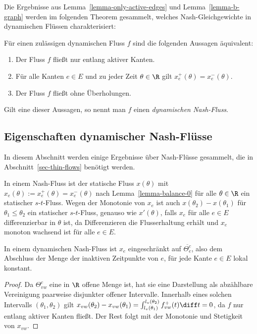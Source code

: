 Die Ergebnisse aus Lemma~\ref{lemma-only-active-edges} und Lemma~\ref{lemma-b-graph} werden im folgenden Theorem gesammelt, welches Nash-Gleichgewichte in dynamischen Flüssen charakterisiert:

\begin{theorem}\label{thm-equivalencies-nash-flow}
	Für einen zulässigen dynamischen Fluss $f$ sind die folgenden Aussagen äquivalent:
	\begin{enumerate}[label=(\roman*)]
		\item Der Fluss $f$ fließt nur entlang aktiver Kanten.
		\item Für alle Kanten $e\in E$ und zu jeder Zeit $\theta\in\R$ gilt $x_e^+(\theta) = x_e^-(\theta)$.
		\item Der Fluss $f$ fließt ohne Überholungen.
	\end{enumerate}
	Gilt eine dieser Aussagen, so nennt man $f$ einen \emph{dynamischen Nash-Fluss}.
\end{theorem}

\subsection{Eigenschaften dynamischer Nash-Flüsse}

In diesem Abschnitt werden einige Ergebnisse über Nash-Flüsse gesammelt, die in Abschnitt~\ref{sec-thin-flows} benötigt werden.

\begin{remark}\label{remark-s-t-flow}
	In einem Nash-Fluss ist der statische Fluss $x(\theta)$ mit $x_e(\theta):=x_e^+(\theta)=x_e^-(\theta)$ nach Lemma~\ref{lemma-balance-0} für alle $\theta\in\R$  ein statischer $s$-$t$-Fluss.
	Wegen der Monotonie von $x_e$ ist auch $x(\theta_2) - x(\theta_1)$ für $\theta_1 \leq \theta_2$ ein statischer $s$-$t$-Fluss, genauso wie $x'(\theta)$, falls $x_e$ für alle $e\in E$ differenzierbar in $\theta$ ist, da Differenzieren die Flusserhaltung erhält und $x_e$ monoton wachsend ist für alle $e\in E$.
\end{remark}

\begin{lemma}\label{lemma-x-locally-constant}
In einem dynamischen Nash-Fluss ist $x_e$ eingeschränkt auf $\overline{\Theta_e^c}$, also dem Abschluss der Menge der inaktiven Zeitpunkte von $e$, für jede Kante $e\in E$ lokal konstant.
\end{lemma}
\begin{proof}
Da $\Theta_{vw}^c$ eine in $\R$ offene Menge ist, hat sie eine Darstellung als abzählbare Vereinigung paarweise disjunkter offener Intervalle.
Innerhalb eines solchen Intervalls $(\theta_1, \theta_2)$ gilt $x_{vw}(\theta_2) - x_{vw}(\theta_1) = \int_{l_v(\theta_1)}^{l_v(\theta_2)} f_{vw}^+(t) \diff t = 0$, da $f$ nur entlang aktiver Kanten fließt.
Der Rest folgt mit der Monotonie und Stetigkeit von $x_{vw}$.
\end{proof}

